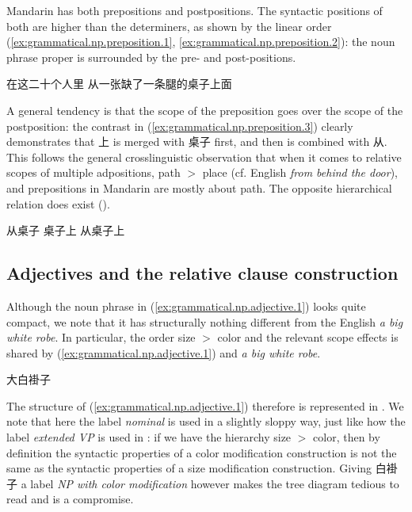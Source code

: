 \documentclass[UTF8, a4paper, oneside, scheme=plain, 12pt]{ctexrep}
\newcommand*{\textgt}{$>$ }
\newcommand*{\term}[1]{\emph{#1}}
\newcommand{\form}[1]{\emph{#1}}
\begin{document}
Mandarin has both prepositions and postpositions.
The syntactic positions of both are higher than the determiners,
as shown by the linear order
(\ref{ex:grammatical.np.preposition.1},
\ref{ex:grammatical.np.preposition.2}):
the noun phrase proper is surrounded by the pre- and post-positions.

\begin{exe}
    \ex\label{ex:grammatical.np.preposition.1} 在这二十个人里
    \ex\label{ex:grammatical.np.preposition.2} 从一张缺了一条腿的桌子上面
\end{exe}

A general tendency is that the scope of the preposition goes over the scope of the postposition:
the contrast in (\ref{ex:grammatical.np.preposition.3})
clearly demonstrates that 上 is merged with 桌子 first, and then is combined with 从.
This follows the general crosslinguistic observation that when it comes to relative scopes of multiple adpositions,
path \textgt{}place (cf. English \form{from behind the door}),
and prepositions in Mandarin are mostly about path.
The opposite hierarchical relation does exist ().

\begin{exe}
    \ex\label{ex:grammatical.np.preposition.3} \begin{xlist}
        \ex *从桌子
        \ex 桌子上
        \ex 从桌子上
    \end{xlist}
\end{exe}

\subsection{Adjectives and the relative clause construction}\label{sec:grammatical.np.adjectives}

Although the noun phrase in (\ref{ex:grammatical.np.adjective.1}) looks quite compact,
we note that it has structurally nothing different from the English \form{a big white robe}.
In particular, the order size \textgt{}color and the relevant scope effects is shared
by (\ref{ex:grammatical.np.adjective.1}) and \form{a big white robe}.

\begin{exe}
    \ex\label{ex:grammatical.np.adjective.1} 大白褂子
\end{exe}

The structure of (\ref{ex:grammatical.np.adjective.1}) therefore is represented in 
.
We note that here the label \term{nominal} is used in a slightly sloppy way,
just like how the label \term{extended VP} is used in :
if we have the hierarchy size \textgt{}color,
then by definition the syntactic properties of a color modification construction
is not the same as the syntactic properties of a size modification construction.
Giving 白褂子 a label \term{NP with color modification} however makes the tree diagram tedious to read
and  is a compromise.
\end{document}
